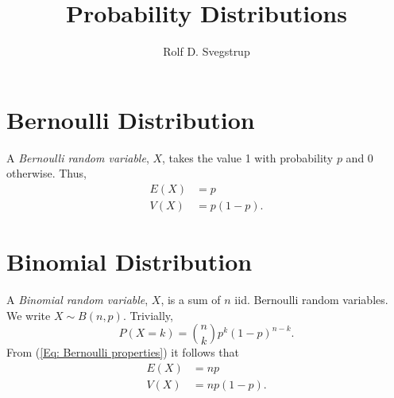 \documentclass{article}
\title{Probability Distributions}
\author{Rolf D. Svegstrup}
\begin{document}
\maketitle

\section{Bernoulli Distribution}
A \emph{Bernoulli random variable}, $X$, takes the value 1 with probability $p$ and 0 otherwise. Thus,
\begin{equation}
\label{Eq: Bernoulli properties}
\begin{split}
E(X) &= p \\ 
V(X) &= p(1-p).
\end{split}
\end{equation}

\section{Binomial Distribution}
A \emph{Binomial random variable}, $X$, is a sum of $n$ iid. Bernoulli random variables. We write $X \sim B(n, p)$. Trivially,
\begin{equation}
P(X = k) = {n \choose k} p^k (1-p)^{n-k}.
\end{equation}
From (\ref{Eq: Bernoulli properties}) it follows that
\begin{equation}
\begin{split}
E(X) &= np \\
V(X) &= np(1-p) .
\end{split}
\end{equation}
\end{document}
